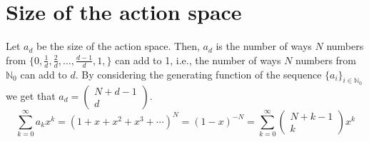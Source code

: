 \documentclass[a4paper,11pt]{article}
\begin{document}
\section*{Size of the action space}
Let $a_d$ be the size of the action space. Then, $a_d$ is the number of ways $N$ numbers from $\{0,\frac{1}{d},\frac{2}{d},\dots,\frac{d-1}{d},1,\}$ can add to 1, i.e., the number of ways $N$ numbers from $\mathbb{N}_0$ can add to $d$. By considering the generating function of the sequence $\{a_i\}_{i\in \mathbb{N}_0}$ we get that $a_d =
\left(\begin{array}{cc}
    N+d-1\\
    d
\end{array}\right)$.
$$
\sum_{k=0}^\infty a_k x^k = (1 + x + x^2 + x^3 + \cdots)^N = (1-x)^{-N} = \sum_{k=0}^\infty \left(\begin{array}{cc}
    N+k-1\\
    k
\end{array}\right) x^k
$$


     
\end{document}

